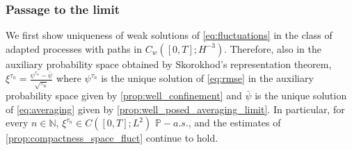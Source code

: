 \documentclass[a4paper,10pt]{amsart}
\newtheorem{lemma}[theorem]{Lemma}
\theoremstyle{remark}
\numberwithin{equation}{section}
\begin{document}
\subsubsection{Passage to the limit}\label{subsec:limit_fluct}
We first show uniqueness of weak solutions of \eqref{eq:fluctuations} in the class of adapted processes with paths in $C_w([0,T];H^{-3})$. Therefore, also in the auxiliary probability space obtained by Skorokhod's representation theorem,
$\xi^{\tau_n}=\frac{\psi^{\tau_n}-\bar{\psi}}{\sqrt{\tau_n}}$ where $\psi^{\tau_n}$ is the unique solution of \eqref{eq:rmse} in the auxiliary probability space given by \cref{prop:well_confinement} and $\bar{\psi}$ is the unique solution of \eqref{eq:averaging} given by \cref{prop:well_posed_averaging_limit}. 
In particular, for every $n\in\mathbb N$,
$\xi^{\tau_n}\in C([0,T];L^2)$ $\mathbb{P}-a.s.$, and the estimates of
\cref{prop:compactness_space_fluct} continue to hold.
\end{document}
